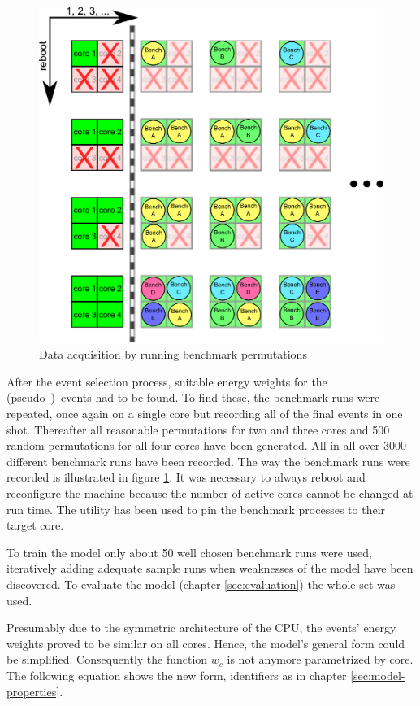 \begin{figure}
  \centering
    \includegraphics[width=\textwidth]{fig/run-benchmarks.eps}
  \caption{Data acquisition by running benchmark permutations}
  \label{fig:run-benchmarks}
\end{figure}

After the event selection process, suitable energy weights for the
(pseudo--)\ events had to be found. To find these, the benchmark runs were
repeated, once again on a single core but recording all of the final events in
one shot. Thereafter all reasonable permutations for two and three cores and 500
random permutations for all four cores have been generated. All in all over 3000
different benchmark runs have been recorded. The way the benchmark runs were
recorded is illustrated in figure \ref{fig:run-benchmarks}. It was necessary to
always reboot and reconfigure the machine because the number of active cores
cannot be changed at run time. The \cite{man:taskset} utility has
been used to pin the benchmark processes to their target core.

To train the model only about 50 well chosen benchmark runs were used,
iteratively adding adequate sample runs when weaknesses of the model have been
discovered. To evaluate the model (chapter \ref{sec:evaluation}) the whole set
was used.

Presumably due to the symmetric architecture of the CPU, the events' energy
weights proved to be similar on all cores. Hence, the model's general form could
be simplified. Consequently the function $w_c$ is not anymore parametrized by
core. The following equation shows the new form, identifiers as in chapter
\ref{sec:model-properties}.


